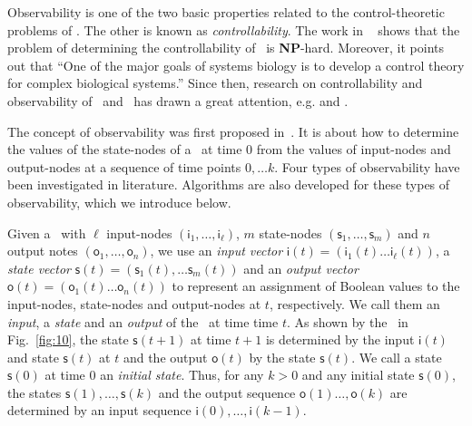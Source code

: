 Observability is one of the two basic  properties related to  the control-theoretic problems of \BCNs. The other is known as {\em controllability}. The work in ~\cite{Akutsu2007Control} shows that the problem of determining the controllability of \BCNs\ is {\bf NP}-hard. Moreover, it  points out that ``One of the major goals of systems biology is to develop a control theory for complex biological systems.''  Since then, research on  controllability and observability of \BNs\ and \BCNs\ has drawn a great attention, e.g. \cite{cheng2009controllability, Zhao2010Input, Cheng2011Identification, Cheng2011Analysis} and \cite{Fornasini2013Observability}. %

 The concept of observability was first proposed in~\cite{cheng2009controllability}. It is about how  to determine  the values of the  state-nodes  of a \BCN\  at time $0$ from the values of  input-nodes  and output-nodes at a sequence of time points $0,\ldots k$. Four  types of observability have been investigated in literature. Algorithms are also developed for  these types of observability, which we introduce below.

Given a \BCN\ with $\ell$ input-nodes $(\mathsf{i}_1,\ldots, \mathsf{i}_\ell)$, $m$ state-nodes $(\mathsf{s}_1,\ldots, \mathsf{s}_m)$ and $n$ output notes  $(\mathsf{o}_1,\ldots, \mathsf{o}_n)$,  we use an {\em input vector} $\mathsf{i}(t)=(\mathsf{i}_1(t)\ldots\mathsf{i}_\ell (t))$, a {\em state vector} $\mathsf{s}(t)=(\mathsf{s}_1(t), \ldots \mathsf{s}_m(t))$ and an {\em output  vector} $\mathsf{o}(t)=(\mathsf{o}_1(t) \ldots \mathsf{o}_n(t))$  to represent an assignment of Boolean values to the  input-nodes, state-nodes and  output-nodes at $t$, respectively.  We call them an {\em input}, a {\em state} and an {\em output} of the \BCN\ at time time $t$. As  shown by the \BCN\ in Fig.~\ref{fig:10},  the state $\mathsf{s}(t+1)$ at time $t+1$ is determined by the input   $\mathsf{i}(t)$ and state $\mathsf{s}(t)$ at $t$  and the output   $\mathsf{o}(t)$ by the state  $\mathsf{s}(t)$.  We call a state $\mathsf{s}(0)$ at time $0$ an {\em initial state}. Thus, for any $k>0$ and any  initial state $\mathsf{s}(0)$, the states  $\mathsf{s}(1),\ldots, \mathsf{s}(k)$ and the output sequence $\mathsf{o}(1)\ldots, \mathsf{o}(k)$ are  determined by an  input sequence $\mathsf{i}(0),\ldots, \mathsf{i}(k-1)$.


